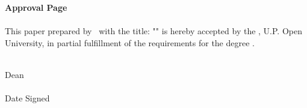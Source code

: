 \begin{approvalpage}
    \textbf{Approval Page} \\\\
    This paper prepared by \AUTHOR\ with the title: "\TITLE" is hereby accepted by the \FACULTY, U.P. Open University, in partial fulfillment of the requirements for the degree \DEGREE.\\

    \vspace{1in}
    \vspace{0.5in}

    \vspace{3in}
    \begin{centering}
    \textbf{\DEAN} \\
    Dean \\
    \FACULTY \\
    \vspace{0.5in}
    Date Signed \\
    \end{centering}
\end{approvalpage}